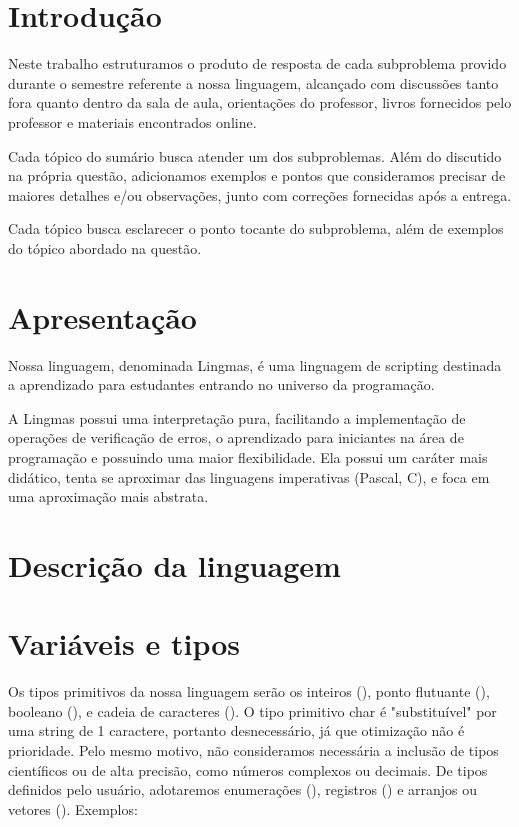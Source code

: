 
\section{Introdução}
Neste trabalho estruturamos o produto de resposta de cada subproblema provido
durante o semestre referente a nossa linguagem, alcançado com discussões tanto
fora quanto dentro da sala de aula, orientações do professor, livros fornecidos
pelo professor e materiais encontrados online.

Cada tópico do sumário busca atender um dos subproblemas. Além do discutido na
própria questão, adicionamos exemplos e pontos que consideramos precisar de
maiores detalhes e/ou observações, junto com correções fornecidas após a
entrega.

Cada tópico busca esclarecer o ponto tocante do subproblema, além de exemplos
do tópico abordado na questão.

\section{Apresentação}
Nossa linguagem, denominada Lingmas, é uma linguagem de scripting destinada a
aprendizado para estudantes entrando no universo da programação.

A Lingmas possui uma interpretação pura, facilitando a implementação de
operações de verificação de erros, o aprendizado para iniciantes na área de
programação e possuindo uma maior flexibilidade. Ela possui um caráter mais
didático, tenta se aproximar das linguagens imperativas (Pascal, C), e foca em
uma aproximação mais abstrata.

\section{Descrição da linguagem}

\section{Variáveis e tipos}

Os tipos primitivos da nossa linguagem serão os inteiros (), ponto flutuante
(), booleano (), e cadeia de caracteres (). O tipo primitivo
char é "substituível" por uma string de 1 caractere, portanto desnecessário, já
que otimização não é prioridade. Pelo mesmo motivo, não consideramos necessária
a inclusão de tipos científicos ou de alta precisão, como números complexos ou
decimais. De tipos definidos pelo usuário, adotaremos enumerações (),
registros () e arranjos ou vetores (). Exemplos:

